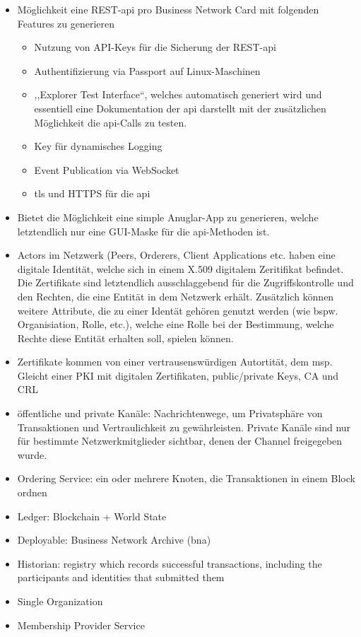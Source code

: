         \begin{itemize}[noitemsep]
            \item Möglichkeit eine REST-\gls{api} pro Business Network Card mit folgenden Features zu generieren
                \begin{itemize}[noitemsep]
                    \item Nutzung von API-Keys für die Sicherung der REST-\gls{api}
                    \item Authentifizierung via Passport auf Linux-Maschinen
                    \item ,,Explorer Test Interface``, welches automatisch generiert wird und essentiell eine Dokumentation der \gls{api} darstellt mit der zusätzlichen Möglichkeit die \gls{api}-Calls zu testen.
                    \item Key für dynamisches Logging
                    \item Event Publication via WebSocket
                    \item \gls{tls} und HTTPS für die \gls{api}
                \end{itemize}
            \item Bietet die Möglichkeit eine simple Anuglar-App zu generieren, welche letztendlich nur eine GUI-Maske für die \gls{api}-Methoden ist.
            \item Actors im Netzwerk (Peers, Orderers, Client Applications etc. haben eine digitale Identität, welche sich in einem X.509 digitalem Zeritifikat befindet.
                Die Zertifikate sind letztendlich ausschlaggebend für die Zugriffskontrolle und den Rechten, die eine Entität in dem Netzwerk erhält. 
                Zusätzlich können weitere Attribute, die zu einer Identät gehören genutzt werden (wie bspw. Organisiation, Rolle, etc.), welche eine Rolle bei der Bestimmung, welche Rechte diese Entität erhalten soll, spielen können.
            \item Zertifikate kommen von einer vertrausenswürdigen Autortität, dem \gls{msp}. 
                Gleicht einer PKI mit digitalen Zertifikaten, public/\-private Keys, CA und CRL
            \item öffentliche und private Kanäle: Nachrichtenwege, um Privatsphäre von Transaktionen und Vertraulichkeit zu gewährleisten.
                Private Kanäle sind nur für bestimmte Netzwerkmitglieder sichtbar, denen der Channel freigegeben wurde.
            \item Ordering Service: ein oder mehrere Knoten, die Transaktionen in einem Block ordnen
            \item Ledger: Blockchain + World State
            \item Deployable: Business Network Archive (bna)
            \item Historian: registry which records successful transactions, including the participants and identities that submitted them
        \end{itemize}
        
        \begin{itemize}[noitemsep]
            \item Single Organization 
            \item Membership Provider Service
        \end{itemize}
    
